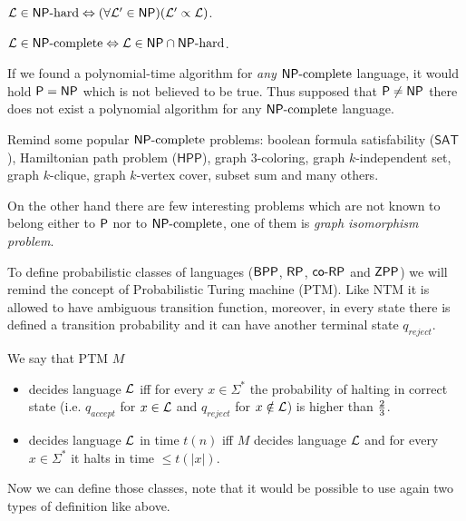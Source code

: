 		\begin{defn}
			${\cal L}\in\NPH \iff (\forall{\cal L'}\in\NP)({\cal L'}\propto{\cal L})$.
		\end{defn}
		
		\begin{defn}
			${\cal L}\in\NPC\iff{\cal L}\in\NP\cap\NPH$.
		\end{defn}
		
		\begin{note}
			If we found a polynomial-time algorithm for {\em any} $\NPC$ language, it would hold $\P=\NP$ which is not believed to be true. Thus supposed that $\P\neq\NP$ there does not exist a polynomial algorithm for any $\NPC$ language.
		\end{note}
		
		\begin{example}\label{exm:npc}
			Remind some popular $\NPC$ problems: boolean formula satisfability ($\mathsf{SAT}$), Hamiltonian path problem ($\mathsf{HPP}$), graph $3$-coloring, graph $k$-independent set, graph $k$-clique, graph $k$-vertex cover, subset sum and many others.
			
			On the other hand there are few interesting problems which are not known to belong either to $\P$ nor to $\NPC$, one of them is {\em graph isomorphism problem}.
		\end{example}
		
		
		To define probabilistic classes of languages ($\BPP$, $\RP$, $\coRP$ and $\ZPP$) we will remind the concept of Probabilistic Turing machine (PTM). Like NTM it is allowed to have ambiguous transition function, moreover, in every state there is defined a transition probability and it can have another terminal state $q_{reject}$.
		
		We say that PTM $M$
		\begin{itemize}
			\item decides language $\cal L$ iff for every $x\in\Sigma^*$ the probability of halting in correct state (i.e. $q_{accept}$ for $x\in{\cal L}$ and $q_{reject}$ for $x\notin{\cal L}$) is higher than $\nicefrac{2}{3}$.
			\item decides language $\cal L$ in time $t(n)$ iff $M$ decides language $\cal L$ and for every $x\in\Sigma^*$ it halts in time $\leq t(|x|)$.
		\end{itemize}
		Now we can define those classes, note that it would be possible to use again two types of definition like above.
		
